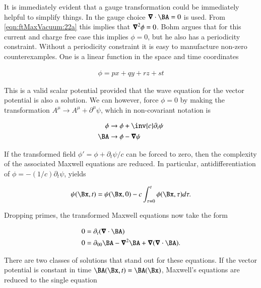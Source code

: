 It is immediately evident that a gauge transformation could be immediately helpful to simplify things.  In \cite{bohm1989qt} the gauge choice $\spacegrad \cdot \BA = 0$ is used.  From \autoref{eqn:ftMaxVacuum:22a} this implies that $\boldsymbol{\nabla}^2 \phi = 0$.  Bohm argues that for this current and charge free case this implies $\phi = 0$, but he also has a periodicity constraint.  Without a periodicity constraint it is easy to manufacture non-zero counterexamples.  One is a linear function in the space and time coordinates

\begin{align}
\label{eqn:ftMaxVacuum:23}
\phi = p x + q y + r z + s t
\end{align}

This is a valid scalar potential provided that the wave equation for the vector potential is also a solution.  We can however, force $\phi = 0$ by making the transformation $A^\mu \rightarrow A^\mu + \partial^\mu \psi$, which in non-covariant notation is

\begin{align}
\label{eqn:ftMaxVacuum:24}
\phi &\rightarrow \phi + \inv{c} \partial_t \psi \\
\BA &\rightarrow \phi - \spacegrad \psi
\end{align}

If the transformed field $\phi' = \phi + \partial_t \psi/c$ can be forced to zero, then the complexity of the associated Maxwell equations are reduced.  In particular, antidifferentiation of $\phi = -(1/c) \partial_t \psi$, yields

\begin{align}
\label{eqn:ftMaxVacuum:25}
\psi(\Bx,t) = \psi(\Bx, 0) - c \int_{\tau=0}^t \phi(\Bx, \tau) d\tau.
\end{align}

Dropping primes, the transformed Maxwell equations now take the form

\begin{subequations}
\label{eqn:ftMaxVacuum:26}
\begin{align}
0 &= \partial_t( \spacegrad \cdot \BA )
\label{eqn:ftMaxVacuum:26a}
\\
0 &=
\partial_{00} \BA - \spacegrad^2 \BA + \spacegrad (\spacegrad \cdot \BA ).
\label{eqn:ftMaxVacuum:26b}
\end{align}
\end{subequations}

There are two classes of solutions that stand out for these equations.  If the vector potential is constant in time $\BA(\Bx,t) = \BA(\Bx)$, Maxwell's equations are reduced to the single equation

